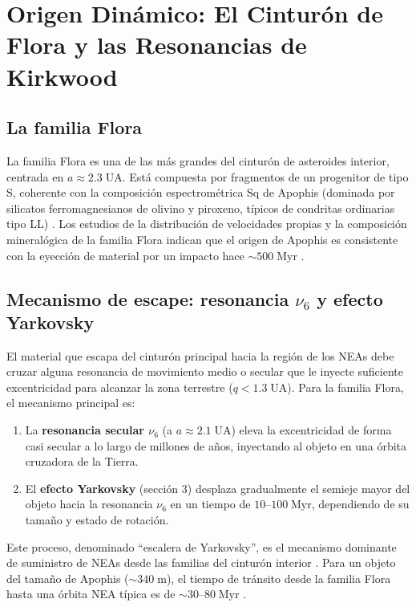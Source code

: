 \documentclass[a4paper]{article}
\begin{document}
\section{Origen Dinámico: El Cinturón de Flora y las Resonancias de Kirkwood}

\subsection{La familia Flora}

La familia Flora es una de las más grandes del cinturón de asteroides interior, centrada en $a \approx 2.3\;\text{UA}$. Está compuesta por fragmentos de un progenitor de tipo S, coherente con la composición espectrométrica Sq de Apophis (dominada por silicatos ferromagnesianos de olivino y piroxeno, típicos de condritas ordinarias tipo LL) \cite{broz2026apophis}. Los estudios de la distribución de velocidades propias y la composición mineralógica de la familia Flora indican que el origen de Apophis es consistente con la eyección de material por un impacto hace $\sim 500\;\text{Myr}$ \cite{broz2026apophis}.

\subsection{Mecanismo de escape: resonancia $\nu_6$ y efecto Yarkovsky}

El material que escapa del cinturón principal hacia la región de los NEAs debe cruzar alguna resonancia de movimiento medio o secular que le inyecte suficiente excentricidad para alcanzar la zona terrestre ($q < 1.3\;\text{UA}$). Para la familia Flora, el mecanismo principal es:

\begin{enumerate}
  \item La \textbf{resonancia secular $\nu_6$} (a $a \approx 2.1\;\text{UA}$) eleva la excentricidad de forma casi secular a lo largo de millones de años, inyectando al objeto en una órbita cruzadora de la Tierra.
  \item El \textbf{efecto Yarkovsky} (sección 3) desplaza gradualmente el semieje mayor del objeto hacia la resonancia $\nu_6$ en un tiempo de $10$--$100\;\text{Myr}$, dependiendo de su tamaño y estado de rotación.
\end{enumerate}

Este proceso, denominado ``escalera de Yarkovsky'', es el mecanismo dominante de suministro de NEAs desde las familias del cinturón interior \cite{vokrouhlicky2015yarkovsky, broz2026apophis}. Para un objeto del tamaño de Apophis ($\sim 340\;\text{m}$), el tiempo de tránsito desde la familia Flora hasta una órbita NEA típica es de $\sim 30$--$80\;\text{Myr}$ \cite{broz2026apophis}.
\end{document}

